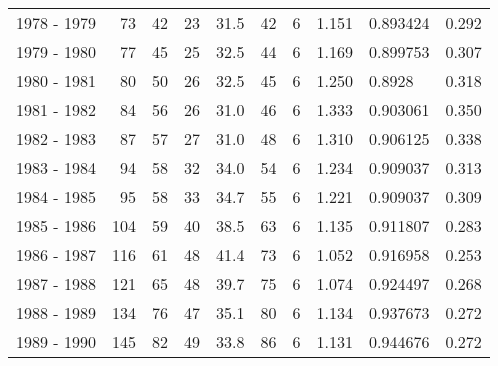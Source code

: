 \begin{tabular}{lrrrrrrrlr}
1978 - 1979 &       73 &       42 &                23 &              31.5 &                      42 &                          6 &       1.151 &   0.893424 &             0.292 \\
1979 - 1980 &       77 &       45 &                25 &              32.5 &                      44 &                          6 &       1.169 &   0.899753 &             0.307 \\
1980 - 1981 &       80 &       50 &                26 &              32.5 &                      45 &                          6 &       1.250 &     0.8928 &             0.318 \\
1981 - 1982 &       84 &       56 &                26 &              31.0 &                      46 &                          6 &       1.333 &   0.903061 &             0.350 \\
1982 - 1983 &       87 &       57 &                27 &              31.0 &                      48 &                          6 &       1.310 &   0.906125 &             0.338 \\
1983 - 1984 &       94 &       58 &                32 &              34.0 &                      54 &                          6 &       1.234 &   0.909037 &             0.313 \\
1984 - 1985 &       95 &       58 &                33 &              34.7 &                      55 &                          6 &       1.221 &   0.909037 &             0.309 \\
1985 - 1986 &      104 &       59 &                40 &              38.5 &                      63 &                          6 &       1.135 &   0.911807 &             0.283 \\
1986 - 1987 &      116 &       61 &                48 &              41.4 &                      73 &                          6 &       1.052 &   0.916958 &             0.253 \\
1987 - 1988 &      121 &       65 &                48 &              39.7 &                      75 &                          6 &       1.074 &   0.924497 &             0.268 \\
1988 - 1989 &      134 &       76 &                47 &              35.1 &                      80 &                          6 &       1.134 &   0.937673 &             0.272 \\
1989 - 1990 &      145 &       82 &                49 &              33.8 &                      86 &                          6 &       1.131 &   0.944676 &             0.272 \\

\end{tabular}
